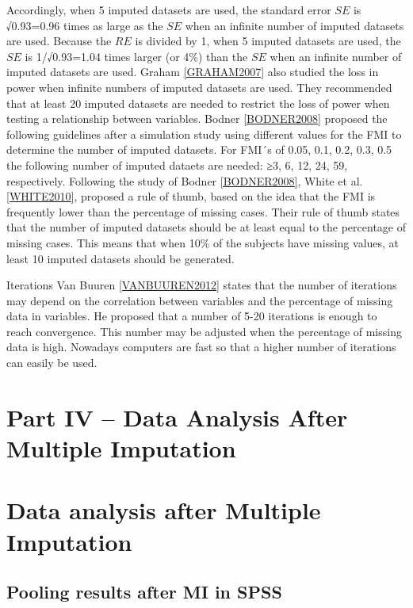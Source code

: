\documentclass[]{book}
\begin{document}
Accordingly, when 5 imputed datasets are used, the standard error \(SE\)
is √0.93=0.96 times as large as the \(SE\) when an infinite number of
imputed datasets are used. Because the \(RE\) is divided by 1, when 5
imputed datasets are used, the \(SE\) is 1/√0.93=1.04 times larger (or
4\%) than the \(SE\) when an infinite number of imputed datasets are
used. Graham \ref{GRAHAM2007} also studied the loss in power when
infinite numbers of imputed datasets are used. They recommended that at
least 20 imputed datasets are needed to restrict the loss of power when
testing a relationship between variables. Bodner \ref{BODNER2008}
proposed the following guidelines after a simulation study using
different values for the FMI to determine the number of imputed
datasets. For FMI´s of 0.05, 0.1, 0.2, 0.3, 0.5 the following number of
imputed dataets are needed: ≥3, 6, 12, 24, 59, respectively. Following
the study of Bodner \ref{BODNER2008}, White et al. \ref{WHITE2010},
proposed a rule of thumb, based on the idea that the FMI is frequently
lower than the percentage of missing cases. Their rule of thumb states
that the number of imputed datasets should be at least equal to the
percentage of missing cases. This means that when 10\% of the subjects
have missing values, at least 10 imputed datasets should be generated.

Iterations Van Buuren \ref{VANBUUREN2012} states that the number of
iterations may depend on the correlation between variables and the
percentage of missing data in variables. He proposed that a number of
5-20 iterations is enough to reach convergence. This number may be
adjusted when the percentage of missing data is high. Nowadays computers
are fast so that a higher number of iterations can easily be used.

\chapter*{Part IV -- Data Analysis After Multiple
Imputation}\label{part-iv-data-analysis-after-multiple-imputation}

\chapter{Data analysis after Multiple
Imputation}\label{data-analysis-after-multiple-imputation}

\section{Pooling results after MI in
SPSS}\label{pooling-results-after-mi-in-spss}
\end{document}
